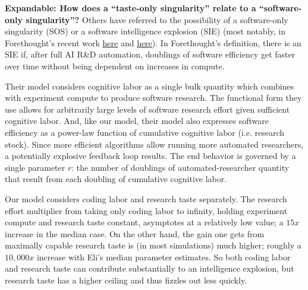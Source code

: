 \documentclass{article}
\theoremstyle{definition}
\newcommand{\ESUG}[1]{\textcolor{purple}{ELI-SUGGESTION: #1}}
\begin{document}

\textbf{Expandable: How does a ``taste-only singularity'' relate to a ``software-only singularity''?}
Others have referred to the possibility of a software-only singularity (SOS) or a software intelligence explosion (SIE) (most notably, in Forethought's recent work \href{https://www.forethought.org/research/how-quick-and-big-would-a-software-intelligence-explosion-be}{here} and \href{https://www.forethought.org/research/will-ai-r-and-d-automation-cause-a-software-intelligence-explosion}{here}). In Forethought's definition, there is an SIE if, after full AI R\&D automation, doublings of software efficiency get faster over time without being dependent on increases in compute.

Their model considers cognitive labor as a single bulk quantity which combines with experiment compute to produce software research. The functional form they use allows for arbitrarily large levels of software research effort given sufficient cognitive labor. And, like our model, their model also expresses software efficiency as a power-law function of cumulative cognitive labor (i.e. research stock). Since more efficient algorithms allow running more automated researchers, a potentially explosive feedback loop results. The end behavior is governed by a single parameter $r$: the number of doublings of automated-researcher quantity that result from each doubling of cumulative cognitive labor. 

Our model considers coding labor and research taste separately. The research effort multiplier from taking only coding labor to infinity, holding experiment compute and research taste constant, asymptotes at a relatively low value; a $15x$ increase in the median case. On the other hand, the gain one gets from maximally capable research taste is (in most simulations) much higher; roughly a $10,000x$ increase with Eli's median parameter estimates. So both coding labor and research taste can contribute substantially to an intelligence explosion, but research taste has a higher ceiling and thus fizzles out less quickly.

\end{document}
